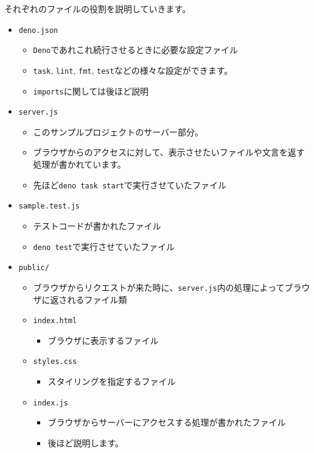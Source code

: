 それぞれのファイルの役割を説明していきます。

\begin{itemize}
\tightlist
\item
  \texttt{deno.json}

  \begin{itemize}
  \tightlist
  \item
    \texttt{Deno}であれこれ続行させるときに必要な設定ファイル
  \item
    \texttt{task}, \texttt{lint}, \texttt{fmt},
    \texttt{test}などの様々な設定ができます。
  \item
    \texttt{imports}に関しては後ほど説明
  \end{itemize}
\item
  \texttt{server.js}

  \begin{itemize}
  \tightlist
  \item
    このサンプルプロジェクトのサーバー部分。
  \item
    ブラウザからのアクセスに対して、表示させたいファイルや文言を返す処理が書かれています。
  \item
    先ほど\texttt{deno\ task\ start}で実行させていたファイル
  \end{itemize}
\item
  \texttt{sample.test.js}

  \begin{itemize}
  \tightlist
  \item
    テストコードが書かれたファイル
  \item
    \texttt{deno\ test}で実行させていたファイル
  \end{itemize}
\item
  \texttt{public/}

  \begin{itemize}
  \tightlist
  \item
    ブラウザからリクエストが来た時に、\texttt{server.js}内の処理によってブラウザに返されるファイル類
  \item
    \texttt{index.html}

    \begin{itemize}
    \tightlist
    \item
      ブラウザに表示するファイル
    \end{itemize}
  \item
    \texttt{styles.css}

    \begin{itemize}
    \tightlist
    \item
      スタイリングを指定するファイル
    \end{itemize}
  \item
    \texttt{index.js}

    \begin{itemize}
    \tightlist
    \item
      ブラウザからサーバーにアクセスする処理が書かれたファイル
    \item
      後ほど説明します。
    \end{itemize}
  \end{itemize}
\end{itemize}

